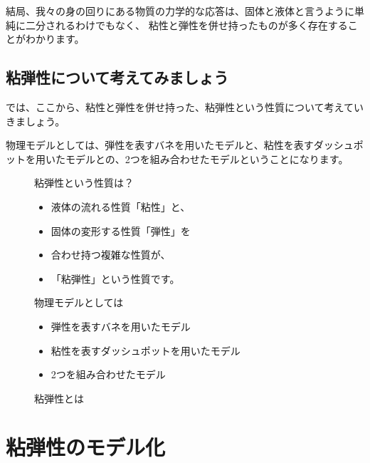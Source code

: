 \documentclass[uplatex,dvipdfmx,a4paper,11pt]{jsreport}
\begin{document}
結局、我々の身の回りにある物質の力学的な応答は、固体と液体と言うように単純に二分されるわけでもなく、
粘性と弾性を併せ持ったものが多く存在することがわかります。

\subsection{粘弾性について考えてみましょう}

では、ここから、粘性と弾性を併せ持った、粘弾性という性質について考えていきましょう。

物理モデルとしては、弾性を表すバネを用いたモデルと、粘性を表すダッシュポットを用いたモデルとの、2つを組み合わせたモデルということになります。

\begin{figure}[htb]
	\begin{center}
		\begin{minipage}{0.4\textwidth}
			\begin{itembox}[l]{粘弾性という性質は？}
				\begin{itemize}
					\item 液体の流れる性質「粘性」と、
					\item 固体の変形する性質「弾性」を
					\item 合わせ持つ複雑な性質が、
					\item 「粘弾性」という性質です。
				\end{itemize}
			\end{itembox}
		\end{minipage}
		\begin{minipage}{0.45\textwidth}
			\begin{itembox}[l]{物理モデルとしては}
				\begin{itemize}
					\item 弾性を表すバネを用いたモデル
					\item 粘性を表すダッシュポットを用いたモデル
					\item 2つを組み合わせたモデル
				\end{itemize}
			\end{itembox}
		\end{minipage}
		\caption{粘弾性とは}
	\end{center}
\end{figure}

\section{粘弾性のモデル化}
\end{document}
